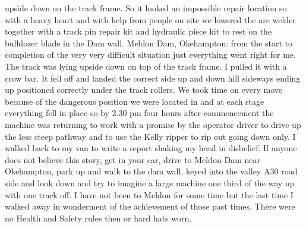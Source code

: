 upside down on the track frame. So it looked an impossible repair location so
with a heavy heart and with help from people on site we lowered the arc welder
together with a track pin repair kit and hydraulic piece kit to rest on the
bulldozer blade in the Dam wall. Meldon Dam, Okehampton: from the start to
completion of the very very difficult situation just everything went right for
me. The track was lying upside down on top of the track frame. I pulled it with
a crow bar. It fell off and landed the correct side up and down hill sideways
ending up positioned correctly under the track rollers. We took time on every
move because of the dangerous position we were located in and at each stage
everything fell in place so by 2.30 pm four hours after commencement the
machine was returning to work with a promise by the operator driver to drive up
the less steep pathway and to use the Kelly ripper to rip out going down only.
I walked back to my van to write a report shaking my head in disbelief. If
anyone does not believe this story, get in your car, drive to Meldon Dam near
Okehampton, park up and walk to the dam wall, keyed into the valley A30 road
side and look down and try to imagine a large machine one third of the way up
with one track off. I have not been to Meldon for some time but the last time I
walked away in wonderment of the achievement of those past times. There were no
Health and Safety rules then or hard hats worn.
